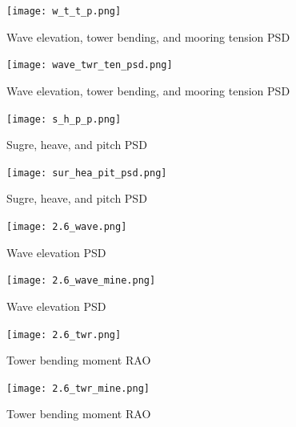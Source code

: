 \documentclass[a4paper, 11pt]{article}
\begin{document}
\begin{figure}[H]
    \centering
    \texttt{[image: w\_t\_t\_p.png]}
    \caption{\small Wave elevation, tower bending, and mooring tension PSD \cite{Robertson2014}}
    \label{fig:w_t_t_p}
\end{figure}

\begin{figure}[H]
    \centering
    \texttt{[image: wave\_twr\_ten\_psd.png]}
    \caption{\small Wave elevation, tower bending, and mooring tension PSD}
    \label{fig:w_t_t_p_mine}
\end{figure}

\begin{figure}[H]
    \centering
    \texttt{[image: s\_h\_p\_p.png]}
    \caption{\small Sugre, heave, and pitch PSD \cite{Robertson2014}}
    \label{fig:s_h_p_p}
\end{figure}

\begin{figure}[H]
    \centering
    \texttt{[image: sur\_hea\_pit\_psd.png]}
    \caption{\small Sugre, heave, and pitch PSD}
    \label{fig:s_h_p_p_mine}
\end{figure}

\begin{figure}[H]
    \begin{minipage}{0.48\textwidth}
        \centering
        \texttt{[image: 2.6\_wave.png]}
        \caption{\small Wave elevation PSD \cite{Robertson2014}} 
        \label{fig:2.6_wave}
    \end{minipage}
    \hfill
    \begin{minipage}{0.51\textwidth}
        \centering
        \vspace{-0.3cm}
        \texttt{[image: 2.6\_wave\_mine.png]}
        \caption{\small Wave elevation PSD}
        \label{fig:2.6_wave_mine}
    \end{minipage}
\end{figure}

\begin{figure}[H]
    \begin{minipage}{0.48\textwidth}
        \centering
        \texttt{[image: 2.6\_twr.png]}
        \caption{\small Tower bending moment RAO \cite{Robertson2014}}
        \label{fig:2.6_twr}
    \end{minipage}
    \hfill
    \begin{minipage}{0.5\textwidth}
        \centering
        \vspace{0.6cm}
        \texttt{[image: 2.6\_twr\_mine.png]}
        \caption{\small Tower bending moment RAO} 
        \label{fig:2.6_twr_mine}
    \end{minipage}
\end{figure}
\end{document}
